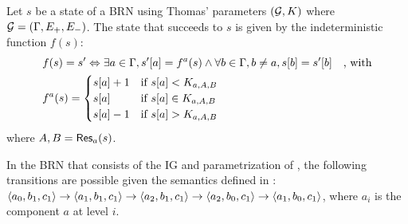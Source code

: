 \begin{definition}\label{def:dynamics}
Let $s$ be a state of a BRN using Thomas' parameters $(\mathcal{G}, K)$ where $\mathcal{G} = (\Gamma, E_+, E_-)$.
The state that succeeds to $s$ is given by the indeterministic function $f(s)$:
\begin{align*}
  & f(s) = s' \Leftrightarrow \exists a \in \Gamma,
    \GRNget{s'}{a} = f^a(s) \wedge
    \forall b \in \Gamma, b \neq a, \GRNget{s}{b} = \GRNget{s'}{b}
    \quad\text{, with}\\
  & f^a(s) =
  \begin{cases}
    \GRNget{s}{a} + 1 & \text{if } \GRNget{s}{a} < K_{a,A,B} \\%
    \GRNget{s}{a} & \text{if } \GRNget{s}{a} \in K_{a,A,B} \\ %
    \GRNget{s}{a} - 1 & \text{if } \GRNget{s}{a} > K_{a,A,B} %
  \end{cases}
\end{align*}
where $A,B=\mathsf{Res}_{a}(s)$.
\end{definition}

\begin{example*}
In the BRN that consists of the IG and parametrization of , the following
transitions are possible given the semantics defined in :
$\mbox{$\langle a_0, b_1, c_1 \rangle$} \rightarrow \mbox{$\langle a_1, b_1, c_1 \rangle$} \rightarrow \mbox{$\langle a_2, b_1, c_1 \rangle$} \rightarrow
\mbox{$\langle a_2, b_0, c_1 \rangle$} \rightarrow \mbox{$\langle a_1, b_0, c_1 \rangle$}$,
where $a_i$ is the component $a$ at level $i$.
\end{example*}

